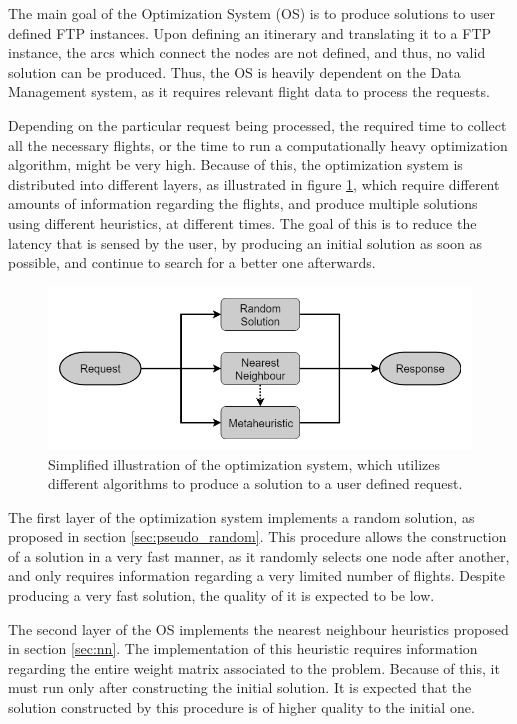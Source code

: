 The main goal of the Optimization System (OS) is to produce solutions to user defined FTP instances. Upon defining an itinerary and translating it to a FTP instance, the arcs which connect the nodes are not defined, and thus, no valid solution can be produced. Thus, the OS is heavily dependent on the Data Management system, as it requires relevant flight data to process the requests. 

Depending on the particular request being processed, the required time to collect all the necessary flights, or the time to run a computationally heavy optimization algorithm, might be very high. Because of this, the optimization system is distributed into different layers, as illustrated in figure \ref{fig:optimization_system}, which require different amounts of information regarding the flights, and produce multiple solutions using different heuristics, at different times. The goal of this is to reduce the latency that is sensed by the user, by producing an initial solution as soon as possible, and continue to search for a better one afterwards.

\begin{figure}[htpb]
  \centering
  \includegraphics[width=\textwidth]{./Figures/system_design/utility.png}
  \caption{Simplified illustration of the optimization system, which utilizes different algorithms 
  to produce a solution to a user defined request.}
  \label{fig:optimization_system}  
\end{figure}

The first layer of the optimization system implements a random solution, as proposed in section \ref{sec:pseudo_random}. This procedure allows the construction of a solution in a very fast manner, as it randomly selects one node after another, and only requires information regarding a very limited number of flights. Despite producing a very fast solution, the quality of it is expected to be low.

The second layer of the OS implements the nearest neighbour heuristics proposed in section \ref{sec:nn}. The implementation of this heuristic requires information regarding the entire weight matrix associated to the problem. Because of this, it must run only after constructing the initial solution. It is expected that the solution constructed by this procedure is of higher quality to the initial one.

